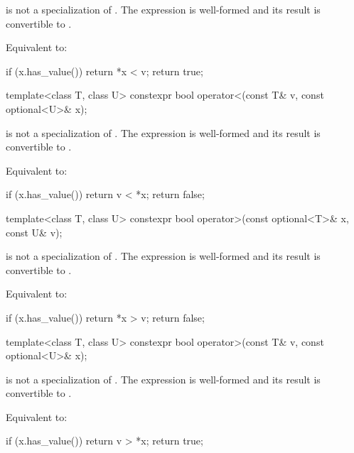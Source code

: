 \begin{itemdescr}
\pnum
\constraints
{} is not a specialization of . The expression  is well-formed and its result is convertible to .

\pnum
\effects
Equivalent to:
\begin{codeblock}
if (x.has_value())
  return *x < v;
return true;
\end{codeblock}
\end{itemdescr}

%
\begin{itemdecl}
template<class T, class U>
  constexpr bool operator<(const T& v, const optional<U>& x);
\end{itemdecl}

\begin{itemdescr}
\pnum
\constraints
{} is not a specialization of . The expression  is well-formed and its result is convertible to .

\pnum
\effects
Equivalent to:
\begin{codeblock}
if (x.has_value())
  return v < *x;
return false;
\end{codeblock}
\end{itemdescr}

%
\begin{itemdecl}
template<class T, class U>
  constexpr bool operator>(const optional<T>& x, const U& v);
\end{itemdecl}

\begin{itemdescr}
\pnum
\constraints
{} is not a specialization of . The expression  is well-formed and its result is convertible to .

\pnum
\effects
Equivalent to:
\begin{codeblock}
if (x.has_value())
  return *x > v;
return false;
\end{codeblock}
\end{itemdescr}

%
\begin{itemdecl}
template<class T, class U>
  constexpr bool operator>(const T& v, const optional<U>& x);
\end{itemdecl}

\begin{itemdescr}
\pnum
\constraints
{} is not a specialization of . The expression  is well-formed and its result is convertible to .

\pnum
\effects
Equivalent to:
\begin{codeblock}
if (x.has_value())
  return v > *x;
return true;
\end{codeblock}
\end{itemdescr}


